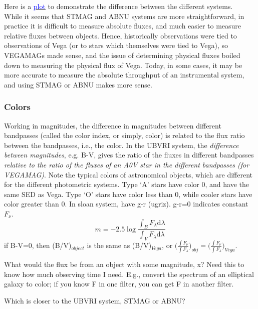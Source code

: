 \documentclass[12pt]{article}
\begin{document}
\noindent Here is a
\href{http://astronomy.nmsu.edu/holtz/a535/html/diagrams/a535/mag.htm}
{\textcolor{blue}{plot}}
to demonstrate the difference between the different systems.\\

\noindent While it seems that STMAG and ABNU systems are more
straightforward, in practice it is difficult to measure absolute
fluxes, and much easier to measure relative fluxes between objects.
Hence, historically observations were tied to observations of Vega (or
to stars which themselves were tied to Vega), so VEGAMAGs made sense,
and the issue of determining physical fluxes boiled down to measuring
the physical flux of Vega. Today, in some cases, it may be more
accurate to measure the absolute throughput of an instrumental system,
and using STMAG or ABNU makes more sense.

\subsubsection*{Colors}
Working in magnitudes, the difference in magnitudes between different
bandpasses (called the color index, or simply, color) is related to
the flux ratio between the bandpasses, i.e., the color.
In the UBVRI
system, the \emph{difference between magnitudes}, e.g. B-V,
gives the ratio of the fluxes in different bandpasses
\emph{relative to the ratio of the fluxes of
an A0V star in the different bandpasses (for VEGAMAG)}.
Note the typical colors of astronomical objects,
which are different for the different photometric systems.
Type `A' stars have color 0, and have the same SED as Vega.
Type `O' stars have color less than 0,
while cooler stars have color greater than 0.
In sloan system, have  g-r (ugriz). g-r=0 indicates constant
$F_{\nu}$.
\begin{equation*}
    m = -2.5\log\frac{\int_B F_{\lambda}\textrm{d}\lambda}
    {\int_V F_{\lambda}\textrm{d}\lambda}
\end{equation*}
if B-V=0, then (B/V)$_{object}$ is the same as (B/V)$_{Vega}$,
or $\Big(\frac{\int F_{\nu}}{\int F_{\lambda}}\Big)_{obj} =
    \Big(\frac{\int F_{\nu}}{\int F_{\lambda}}\Big)_{Vega} $.

What would the flux be from an object with some magnitude,
x? Need this to know how much observing time I need. E.g., convert the
spectrum of an elliptical galaxy to color; if you know F in one
filter, you can get F in another filter.

Which is closer to the UBVRI system, STMAG or ABNU?
\end{document}
